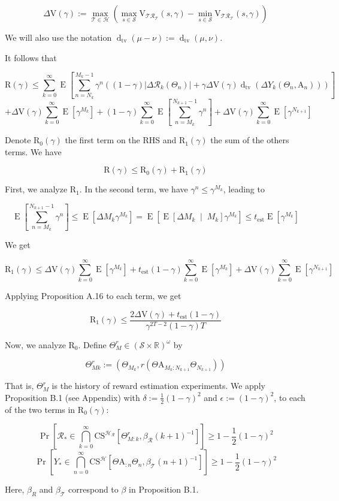 \documentclass[a4paper]{article}
\newcommand{\AP}[1]{\left(#1\right)}
\newcommand{\AB}[1]{\left[#1\right]}
\newcommand{\ABM}[2]{\left[#1\;\middle\vert\;#2\right]}
\newcommand{\Abs}[1]{\left\vert #1 \right\vert}
\newcommand{\Pb}[1]{\operatorname{Pr}\AB{#1}}
\newcommand{\E}[1]{\operatorname{E}\AB{#1}}
\newcommand{\CE}[3]{\underset{#1}{\operatorname{E}}\ABM{#2}{#3}}
\newcommand{\Dtva}[1]{\operatorname{d}_{\text{tv}}\AP{#1}}
\newcommand{\Reals}{\mathbb{R}}
\newcommand{\St}{\mathcal{S}}
\newcommand{\R}{\mathcal{R}}
\newcommand{\T}{\mathcal{T}}
\newcommand{\Hy}{\mathcal{H}}
\newcommand{\Est}{\mathrm{est}}
\newcommand{\V}{\mathrm{V}}
\newcommand{\Reg}{\mathrm{R}}
\newcommand{\SHy}{Y}
\newcommand{\AT}{\mathrm{A}}
\newcommand{\ET}{N}
\newcommand{\IT}{M}
\newcommand{\CS}{\mathrm{CS}}
\begin{document}
$$\Delta\V(\gamma):=\max_{\T\in\Hy}{\AP{\max_{s\in\St}{\V_{\T\R_\T}(s,\gamma)}-\min_{s\in\St}{\V_{\T\R_\T}(s,\gamma)}}}$$

We will also use the notation $\Dtva{\mu-\nu}:=\Dtva{\mu,\nu}$.

It follows that

$$\Reg(\gamma)\leq\sum_{k=0}^\infty\E{\sum_{n=\ET_k}^{\IT_k-1}\gamma^{n}\AP{(1-\gamma)\Abs{\Delta\R_k\AP{\Theta_n}}+\gamma\Delta\V(\gamma)\Dtva{\Delta\SHy_k\AP{\Theta_n,\AT_n}}}}$$
$$+\Delta\V(\gamma)\sum_{k=0}^\infty\E{{\gamma^{\IT_k}}}+(1-\gamma)\sum_{k=0}^\infty\E{\sum_{n=\IT_k}^{\ET_{k+1}-1}\gamma^n}+\Delta\V(\gamma)\sum_{k=0}^\infty\E{\gamma^{\ET_{k+1}}}$$

Denote $\Reg_{0}(\gamma)$ the first term on the RHS and $\Reg_{1}(\gamma)$ the sum of the others terms. We have

$$\Reg(\gamma)\leq\Reg_0(\gamma)+\Reg_1(\gamma)$$

First, we analyze $\Reg_1$. In the second term, we have $\gamma^n\leq\gamma^{M_k}$, leading to

$$\E{\sum_{n=\IT_k}^{\ET_{k+1}-1}\gamma^n}\leq\E{\Delta M_k\gamma^{M_k}}=\E{\CE{}{\Delta M_k}{M_k}\gamma^{M_k}}\leq t_\Est\E{\gamma^{M_k}}$$

We get

$$\Reg_1(\gamma)\leq\Delta\V(\gamma)\sum_{k=0}^\infty\E{{\gamma^{\IT_k}}}+t_\Est(1-\gamma)\sum_{k=0}^\infty\E{\gamma^{M_k}}+\Delta\V(\gamma)\sum_{k=0}^\infty\E{\gamma^{\ET_{k+1}}}$$

Applying Proposition A.16 to each term, we get

$$\Reg_1(\gamma)\leq\frac{2\Delta\V(\gamma)+t_\Est(1-\gamma)}{\gamma^{2T-2}(1-\gamma)T}$$

Now, we analyze $\Reg_0$. Define $\Theta_M^r\in\AP{\St\times\Reals}^\omega$ by

$$\Theta_{Mk}^r:=\AP{\Theta_{M_k},r\AP{\Theta\AT_{M_k:N_{k+1}}\Theta_{N_{k+1}}}}$$

That is, $\Theta_M^r$ is the history of reward estimation experiments. We apply Proposition B.1 (see Appendix) with $\delta:=\frac{1}{2}(1-\gamma)^2$ and $\epsilon:=(1-\gamma)^2$, to each of the two terms in $\Reg_0(\gamma)$:

$$\Pb{\R_*\in\bigcap_{k=0}^\infty\CS^{\Hy_\R}\AB{\Theta_{M:k}^{r},\beta_\R(k+1)^{-1}}} \geq 1-\frac{1}{2}(1-\gamma)^2$$
$$\Pb{\SHy_*\in\bigcap_{n=0}^\infty\CS^{\Hy}\AB{\Theta\AT_{:n}\Theta_n,\beta_\T(n+1)^{-1}}} \geq 1-\frac{1}{2}(1-\gamma)^2$$

Here, $\beta_R$ and $\beta_\T$ correspond to $\beta$ in Proposition B.1.
\end{document}

